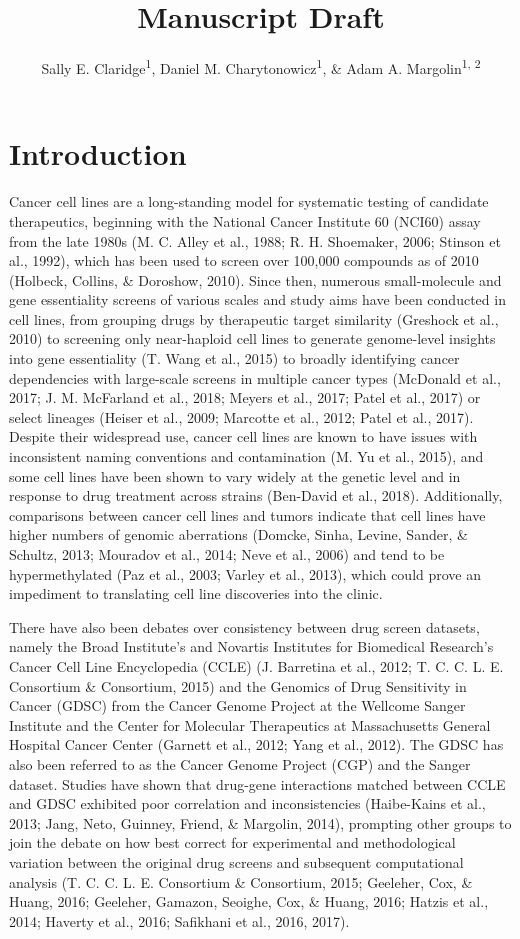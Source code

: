 \documentclass[man]{apa6}
\title{Manuscript Draft}
\author{Sally E. Claridge\textsuperscript{1}, Daniel M.
Charytonowicz\textsuperscript{1}, \& Adam A.
Margolin\textsuperscript{1, 2}}
\date{}
\affiliation{
\vspace{0.5cm}
\textsuperscript{1} Department of Genetics and Genomic Sciences, Icahn Institute for Data Science and Genomic Technology, Icahn School of Medicine at Mount Sinai, New York, NY\\\textsuperscript{2} Cancer Target Discovery and Development Network (Oregon Health and Science University, Portland, OR), National Cancer Institute, National Institutes of Health}
\begin{document}
\maketitle

\section{Introduction}\label{introduction}

Cancer cell lines are a long-standing model for systematic testing of
candidate therapeutics, beginning with the National Cancer Institute 60
(NCI60) assay from the late 1980s (M. C. Alley et al., 1988; R. H.
Shoemaker, 2006; Stinson et al., 1992), which has been used to screen
over 100,000 compounds as of 2010 (Holbeck, Collins, \& Doroshow, 2010).
Since then, numerous small-molecule and gene essentiality screens of
various scales and study aims have been conducted in cell lines, from
grouping drugs by therapeutic target similarity (Greshock et al., 2010)
to screening only near-haploid cell lines to generate genome-level
insights into gene essentiality (T. Wang et al., 2015) to broadly
identifying cancer dependencies with large-scale screens in multiple
cancer types (McDonald et al., 2017; J. M. McFarland et al., 2018;
Meyers et al., 2017; Patel et al., 2017) or select lineages (Heiser et
al., 2009; Marcotte et al., 2012; Patel et al., 2017). Despite their
widespread use, cancer cell lines are known to have issues with
inconsistent naming conventions and contamination (M. Yu et al., 2015),
and some cell lines have been shown to vary widely at the genetic level
and in response to drug treatment across strains (Ben-David et al.,
2018). Additionally, comparisons between cancer cell lines and tumors
indicate that cell lines have higher numbers of genomic aberrations
(Domcke, Sinha, Levine, Sander, \& Schultz, 2013; Mouradov et al., 2014;
Neve et al., 2006) and tend to be hypermethylated (Paz et al., 2003;
Varley et al., 2013), which could prove an impediment to translating
cell line discoveries into the clinic.

There have also been debates over consistency between drug screen
datasets, namely the Broad Institute's and Novartis Institutes for
Biomedical Research's Cancer Cell Line Encyclopedia (CCLE) (J. Barretina
et al., 2012; T. C. C. L. E. Consortium \& Consortium, 2015) and the
Genomics of Drug Sensitivity in Cancer (GDSC) from the Cancer Genome
Project at the Wellcome Sanger Institute and the Center for Molecular
Therapeutics at Massachusetts General Hospital Cancer Center (Garnett et
al., 2012; Yang et al., 2012). The GDSC has also been referred to as the
Cancer Genome Project (CGP) and the Sanger dataset. Studies have shown
that drug-gene interactions matched between CCLE and GDSC exhibited poor
correlation and inconsistencies (Haibe-Kains et al., 2013; Jang, Neto,
Guinney, Friend, \& Margolin, 2014), prompting other groups to join the
debate on how best correct for experimental and methodological variation
between the original drug screens and subsequent computational analysis
(T. C. C. L. E. Consortium \& Consortium, 2015; Geeleher, Cox, \& Huang,
2016; Geeleher, Gamazon, Seoighe, Cox, \& Huang, 2016; Hatzis et al.,
2014; Haverty et al., 2016; Safikhani et al., 2016, 2017).
\end{document}
